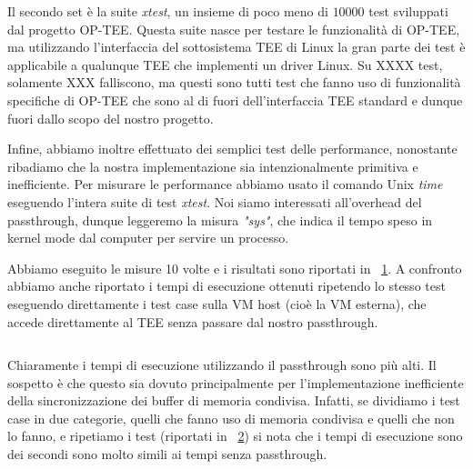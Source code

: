 \documentclass[12pt,italian]{report}
\begin{document}
Il secondo set è la suite \textit{xtest}, un insieme di poco meno di
$10000$ test sviluppati dal progetto OP-TEE. 
Questa suite nasce per testare le funzionalità di OP-TEE, ma utilizzando
l'interfaccia del sottosistema TEE di Linux la gran parte dei test è
applicabile a qualunque TEE che implementi un driver Linux. 
Su XXXX test, solamente XXX falliscono, ma questi sono tutti test che
fanno uso di funzionalità specifiche di OP-TEE che sono al di fuori
dell'interfaccia TEE standard e dunque fuori dallo scopo del nostro
progetto.

Infine, abbiamo inoltre effettuato dei semplici test delle performance,
nonostante ribadiamo che la nostra implementazione sia intenzionalmente
primitiva e inefficiente.
Per misurare le performance abbiamo usato il comando Unix \textit{time}
eseguendo l'intera suite di test \textit{xtest}.
Noi siamo interessati all'overhead del passthrough, dunque leggeremo la
misura \textit{"sys"}, che indica il tempo speso in kernel mode dal computer
per servire un processo. 

Abbiamo eseguito le misure 10 volte e i risultati sono riportati
in \tablename~\ref{tab:performance}.
A confronto abbiamo anche riportato i tempi di esecuzione ottenuti ripetendo
lo stesso test eseguendo direttamente i test case sulla VM host
(cioè la VM esterna), che accede direttamente al TEE senza passare dal
nostro passthrough.

\begin{table}[ht]
\centering
\begin{tabular}{|c|c|c|c|}
\end{tabular}
\label{tab:performance}
\end{table}

Chiaramente i tempi di esecuzione utilizzando il passthrough sono più alti.
Il sospetto è che questo sia dovuto principalmente per l'implementazione
inefficiente della sincronizzazione dei buffer di memoria condivisa.
Infatti, se dividiamo i test case in due categorie, quelli che fanno
uso di memoria condivisa e quelli che non lo fanno, e ripetiamo i test
(riportati in \tablename~\ref{tab:performance-no-shmem}) si nota che
i tempi di esecuzione sono dei secondi sono molto simili ai tempi
senza passthrough.

\begin{table}[ht]
\centering
\begin{tabular}{|c|c|c|c|}
\end{tabular}
\label{tab:performance-no-shmem}
\end{table}
\end{document}
